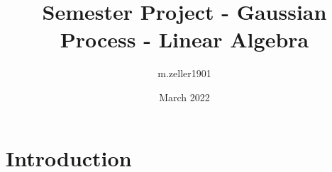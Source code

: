 \documentclass{article}
\title{Semester Project - Gaussian Process - Linear Algebra}
\author{m.zeller1901 }
\date{March 2022}
\begin{document}
\maketitle

\section{Introduction}
\end{document}
